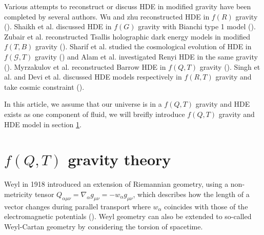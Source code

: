 \documentclass[preprint]{aastex631}
\begin{document}
Various attempts to reconstruct or discuss HDE in modified gravity have been completed by several authors. Wu and zhu reconstructed HDE in $f(R) $ gravity (\cite{wu_reconstructing_2008}). Shaikh et al. discussed HDE in $f (G)$ gravity with Bianchi type 1 model (\cite{shaikh_holographic_2020}). Zubair et al. reconstructed Tsallis holographic dark energy models in modified $f(T, B)$ gravity (\cite{zubair_reconciling_2021}). Sharif et al. studied the cosmological evolution of HDE in $f(\mathcal{G},T)$ gravity (\cite{sharif_cosmic_2019}) and Alam et al. investigated Renyi HDE in the same gravity (\cite{alam_renyi_2023}). Myrzakulov et al. reconstructed Barrow HDE in $f(Q,T)$ gravity (\cite{myrzakulov_barrow_2024}). Singh et al. and Devi et al. discussed HDE models respectively in $f(R,T)$ gravity and take cosmic constraint (\cite{singh_statefinder_2016,devi_barrow_2024}).


In this article, we assume that our universe is in a $f(Q,T)$ gravity and HDE exists as one component of fluid, we will breifly introduce $f(Q,T)$ gravity and HDE model in section \ref{sec:mghde}.

\section{$f(Q,T)$ gravity theory}\label{sec:mghde}

Weyl in 1918 introduced an extension of Riemannian geometry, using a non-metricity tensor $Q_{\alpha \mu \nu}=\nabla_\alpha g_{\mu \nu}=-w_\alpha g_{\mu \nu}$, which describes how the length of a vector changes during parallel transport where $w_\alpha$ coincides with those of the electromagnetic potentials (\cite{Weyl:1918ib}). Weyl geometry can also be extended to so-called Weyl-Cartan geometry by considering the torsion of spacetime.
\end{document}
